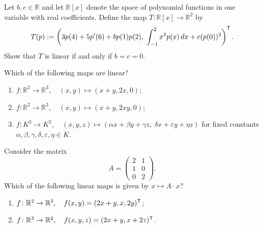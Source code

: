 \begin{exercise}
\label{exc:polynomial_integral_eval_linear_map}
Let $b, c \in \mathbb{R}$ and let $\mathbb{R}[x]$ denote the space of polynomial functions in one variable with real coefficients. Define the map $T \colon \mathbb{R}[x] \to \mathbb{R}^2$ by
\[
T(p) := \left( 3p(4) + 5p'(6) + b p(1)p(2), \; \int_{-1}^2 x^3 p(x) \, dx + c (p(0))^2 \right)^{\mathsf{T}}.
\]
Show that $T$ is linear if and only if $b = c = 0$.
\end{exercise}

\begin{exercise}
\label{exc:identifying_linear_maps_mc}
Which of the following maps are linear?
\begin{enumerate}
    \item $f \colon \mathbb{R}^2 \to \mathbb{R}^3, \quad (x, y) \mapsto (x + y, 2x, 0)$;
    \item $f \colon \mathbb{R}^2 \to \mathbb{R}^3, \quad (x, y) \mapsto (x + y, 2xy, 0)$;
    \item $f \colon K^3 \to K^2, \quad (x, y, z) \mapsto (\alpha x + \beta y + \gamma z, \; \delta x + \varepsilon y + \eta z)$ for fixed constants $\alpha, \beta, \gamma, \delta, \varepsilon, \eta \in K$.
\end{enumerate}
\end{exercise}

\begin{exercise}
\label{exc:matrix_map_mc}
Consider the matrix
\[
A = \begin{pmatrix} 2 & 1 \\ 1 & 0 \\ 0 & 2 \end{pmatrix}.
\]
Which of the following linear maps is given by $x \mapsto A \cdot x$?
\begin{enumerate}
    \item $f \colon \mathbb{R}^2 \to \mathbb{R}^3, \quad f(x, y) = (2x + y, x, 2y)^{\mathsf{T}}$;
    \item $f \colon \mathbb{R}^3 \to \mathbb{R}^2, \quad f(x, y, z) = (2x + y, x + 2z)^{\mathsf{T}}$.
\end{enumerate}
\end{exercise}


